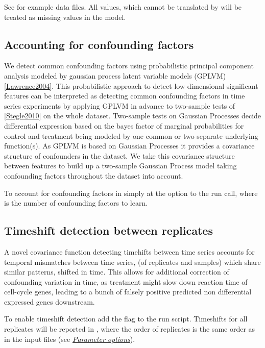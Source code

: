 \documentclass[letterpaper,10pt,english]{sphinxmanual}
\begin{document}
See \code{gptwosample/examples/ToyCondition\{1,2{]}.csv} for example data files.
All values, which cannot be translated by  will be
treated as missing values in the model.


\subsection{Accounting for confounding factors}
\label{confounders:accounting-for-confounding-factors}\label{confounders::doc}\label{confounders:confounders}
We detect common confounding factors using probabilistic principal component
analysis modeled by gaussian process latent variable models (GPLVM)
{\hyperref[confounders:lawrence2004]{{[}Lawrence2004{]}}}. This probabilistic approach to detect low
dimensional significant features can be interpreted as detecting
common confounding factors in time series experiments by applying
GPLVM in advance to two-sample tests of {\hyperref[confounders:stegle2010]{{[}Stegle2010{]}}} on the
whole dataset. Two-sample tests on Gaussian Processes decide
differential expression based on the bayes factor of marginal probabilities
for control and treatment being modeled by one common or two separate
underlying function(s). As GPLVM is based on Gaussian Processes it
provides a covariance structure of confounders in the dataset. We take
this covariance structure between features to build up a two-sample
Gaussian Process model taking confounding factors throughout the
dataset into account.

To account for confounding factors in  simply at the
option  to the run call, where  is the number of
confounding factors to learn.


\subsection{Timeshift detection between replicates}
\label{timeshift:timeshift}\label{timeshift::doc}\label{timeshift:timeshift-detection-between-replicates}
A novel covariance function detecting timehifts between
time series accounts for temporal mismatches between time series, (of
replicates and samples) which share similar patterns, shifted in
time. This allows for additional correction of confounding variation
in time, as treatment might slow down reaction time of cell-cycle
genes, leading to a bunch of falsely positive predicted non differential
expressed genes downstream.

To enable timeshift detection add the flag  to the run
script. Timeshifts for all replicates will be reported in
, where the order of replicates is the same order as in
the input files  (see {\hyperref[usage:usage]{\emph{Parameter options}}}).
\end{document}
